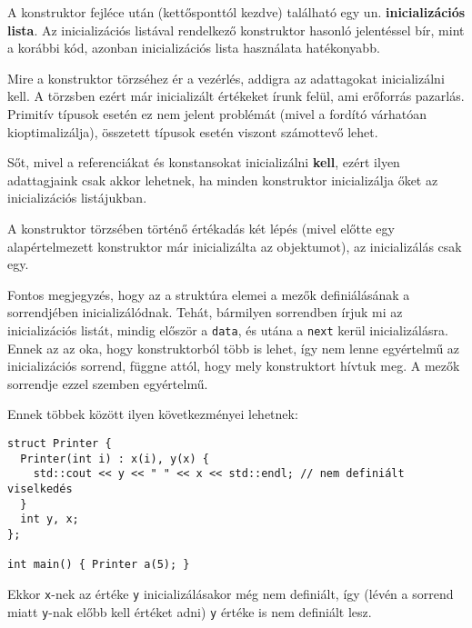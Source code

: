 \documentclass[../cpp_book/cpp_book.tex]{subfiles}
\begin{document}
	\medskip
	A konstruktor fejléce után (kettősponttól kezdve) található egy un. \textbf{inicializációs lista}. Az inicializációs listával rendelkező konstruktor hasonló jelentéssel bír, mint a korábbi kód, azonban inicializációs lista használata hatékonyabb.
	
	Mire a konstruktor törzséhez ér a vezérlés, addigra az adattagokat inicializálni kell. A törzsben ezért már inicializált értékeket írunk felül, ami erőforrás pazarlás. Primitív típusok esetén ez nem jelent problémát (mivel a fordító várhatóan kioptimalizálja), összetett típusok esetén viszont számottevő lehet.
	
	Sőt, mivel a referenciákat és konstansokat inicializálni \textbf{kell}, ezért ilyen adattagjaink csak akkor lehetnek, ha minden konstruktor inicializálja őket az inicializációs listájukban.
	\begin{note}
	    A konstruktor törzsében történő értékadás két lépés (mivel előtte egy alapértelmezett konstruktor már inicializálta az objektumot), az inicializálás csak egy.
	\end{note}
	Fontos megjegyzés, hogy az a struktúra elemei a mezők definiálásának a sorrendjében inicializálódnak. Tehát, bármilyen sorrendben írjuk mi az inicializációs listát, mindig először a \texttt{data}, és utána a \texttt{next} kerül inicializálásra. Ennek az az oka, hogy konstruktorból több is lehet, így nem lenne egyértelmű az inicializációs sorrend, függne attól, hogy mely konstruktort hívtuk meg. A mezők sorrendje ezzel szemben egyértelmű.
	
	Ennek többek között ilyen következményei lehetnek:
	\begin{lstlisting}
struct Printer {
  Printer(int i) : x(i), y(x) {
    std::cout << y << " " << x << std::endl; // nem definiált viselkedés
  }
  int y, x;
};

int main() { Printer a(5); }
	\end{lstlisting}
	Ekkor \texttt{x}-nek az értéke \texttt{y} inicializálásakor még nem definiált, így (lévén a sorrend miatt \texttt{y}-nak előbb kell értéket adni) \texttt{y} értéke is nem definiált lesz.
	
\end{document}
